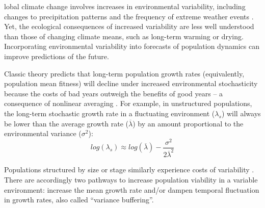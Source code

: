 \documentclass[9pt,twocolumn,twoside]{pnas-new}
\begin{document}


lobal climate change involves increases in environmental variability, including changes to precipitation patterns and the frequency of extreme weather events \cite{seneviratne2012changes, ipcc_2021}.
Yet, the ecological consequences of increased variability are less well understood than those of changing climate means, such as long-term warming or drying. 
Incorporating environmental variability into forecasts of population dynamics can improve predictions of the future.

Classic theory predicts that long-term population growth rates (equivalently, population mean fitness) will decline under increased environmental stochasticity because the costs of bad years outweigh the benefits of good years -- a consequence of nonlinear averaging \cite{lewontin_population_1969,tuljapurkar_population_1982}.
For example, in unstructured populations, the long-term stochastic growth rate in a fluctuating environment ($\lambda_s$) will always be lower than the average growth rate ($\overline{\lambda}$) by an amount proportional to the environmental variance ($\sigma^2$): 
\begin{equation}
	log(\lambda_s)  \approx log(\overline{\lambda}) - \frac{\sigma^2}{2\overline{\lambda}^2}
\end{equation}

\noindent Populations structured by size or stage similarly experience costs of variability \cite{cohen1979comparative, tuljapurkar2013population}.
There are accordingly two pathways to increase population viability in a variable environment: increase the mean growth rate and/or dampen temporal fluctuation in growth rates, also called ``variance buffering''.
\end{document}
